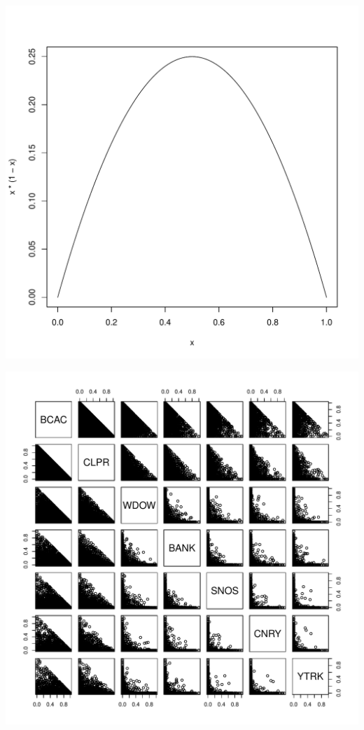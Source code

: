 \documentclass[ xcolor = pdftex, dvipsnames, table ]{beamer}
\begin{document}
\begin{frame}
\begin{minipage}{0.29\textwidth}
	\hspace*{0.5cm}
	\includegraphics[width=\textwidth]{./pictures/constraint.pdf}
	\end{minipage}
\end{frame}

%
%

%
\begin{frame}
\begin{center}
\includegraphics[height=\textheight]{./pictures/253Pairs.pdf}
\end{center}
\end{frame}
\end{document}
